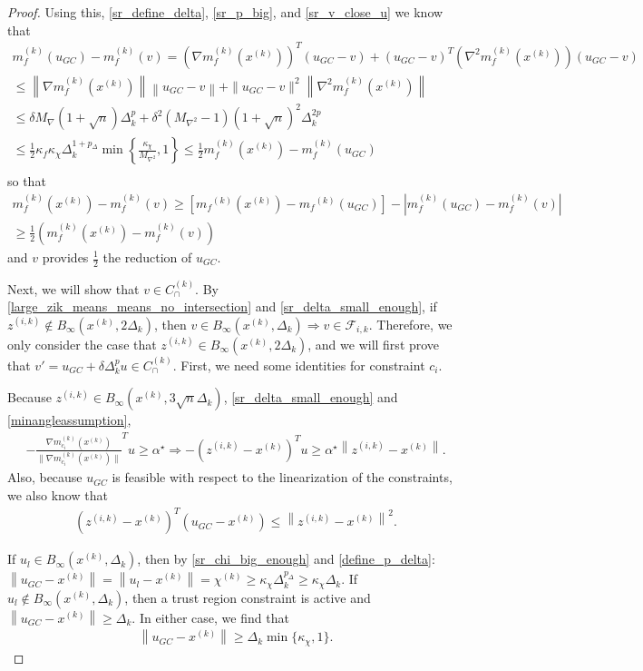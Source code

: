 \documentclass{article}
\theoremstyle{case}
\newcommand{\maxgrad}{{M_{\nabla}}}
\newcommand{\maxhessian}{{M_{\nabla^2}}}
\newcommand{\xk}{{x^{(k)}}}
\newcommand{\dk}{\Delta_k}
\newcommand{\mfk}{{{m}_f}^{(k)}}
\newcommand{\chik}{{\chi^{(k)}}}
\newcommand{\gk}{{\nabla m_f^{(k)}(x^{(k)})}}
\newcommand{\zik}{{z^{(i, k)}}}
\newcommand{\fik}{{\mathcal F_{i, k}}}
\newcommand{\gmcik}{{\nabla m_{c_i}^{(k)}(\xk)}}
\newcommand{\capcones}{{C^{(k)}_{\cap}}}
\newcommand{\minanglealpha}{{ \alpha^{\star} }}
\newcommand{\tr}{{ B_{\infty}\left(\xk, \dk\right) }}
\begin{document}
\begin{proof}
Using this, \cref{sr_define_delta}, \cref{sr_p_big}, and \cref{sr_v_close_u} we know that
\begin{align*}
m_f^{(k)}(u_{GC}) - m_f^{(k)}(v) = 
\left(\gk\right)^T(u_{GC} - v) + \left(u_{GC} - v\right) ^T\left(\nabla^2m_f^{(k)}\left(\xk\right)\right)\left(u_{GC} - v\right) \\
\le \left\|\gk\right \|  \left\|u_{GC}- v\right\|  + \|u_{GC} - v\|^2 \left\|\nabla^2m_f^{(k)}\left(\xk\right)\right\|\\
\le \delta\maxgrad \left(1 + \sqrt{n}\right) \dk^{p}  + \delta^2 \left(\maxhessian - 1\right)\left(1 + \sqrt{n}\right)^2\dk^{2p} \\
\le \frac 1 2 \kappa_f \kappa_{\chi} \dk^{1 + p_{\Delta}}\min\left\{ \frac{\kappa_{\chi}}{\maxhessian}, 1 \right\}
\le \frac 1 2 m_f^{(k)}(\xk) - m_f^{(k)}(u_{GC}) \\
\end{align*}
so that
\begin{align}
m_f^{(k)}(\xk) - m_f^{(k)}(v) \ge \left[\mfk(\xk) - \mfk(u_{GC})\right] - \left|m_f^{(k)}(u_{GC}) - m_f^{(k)}(v) \right| \nonumber \\
\ge \frac 1 2 \left(m_f^{(k)}(\xk) - m_f^{(k)}(v)\right) \label{sr_sr}
\end{align}
and $v$ provides $\frac 1 2$ the reduction of $u_{GC}$.

Next, we will show that $v \in \capcones$.
By \cref{large_zik_means_means_no_intersection} and \cref{sr_delta_small_enough}, if $\zik \not \in B_{\infty}(\xk, 2\dk)$, then $v \in \tr \Longrightarrow v \in \fik$.
Therefore, we only consider the case that $\zik \in B_{\infty}(\xk, 2\dk)$, and we will first prove that $v' = u_{GC} + \delta \dk^{p} u \in \capcones$.
First, we need some identities for constraint $c_i$.

Because $\zik \in B_{\infty}(\xk, 3\sqrt{n} \dk)$, \cref{sr_delta_small_enough} and \cref{minangleassumption}, 
\begin{align}
-\frac {\gmcik}{\|\gmcik\|} ^Tu \ge \minanglealpha \Longrightarrow -\left(\zik - \xk\right)^Tu \ge \minanglealpha \left\|\zik - \xk\right\|. \label{u_is_feasible}
\end{align}
Also, because $u_{GC}$ is feasible with respect to the linearization of the constraints, we also know that
\begin{align}
\left(\zik - \xk\right)^T(u_{GC} - \xk) \le \left\|\zik - \xk\right\|^2. \label{gc_is_feasible}
\end{align}

If $u_l \in \tr$, then by \cref{sr_chi_big_enough} and \cref{define_p_delta}: $\left\|u_{GC} - \xk\right\|  = \left\|u_{l} - \xk\right\| = \chik \ge \kappa_{\chi} \dk^{p_{\Delta}} \ge  \kappa_{\chi} \dk$.
If $u_l \not \in \tr$, then a trust region constraint is active and $\left\|u_{GC} - \xk\right\| \ge \dk$.
In either case, we find that 
\begin{align}
\left\|u_{GC} - \xk\right\| \ge \dk \min\{\kappa_{\chi}, 1 \} \label{gc_big_enough}.
\end{align}



\end{proof}
\end{document}
